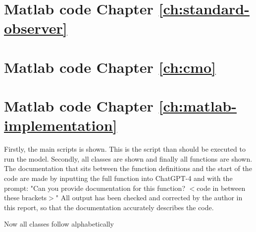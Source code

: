 \begin{appendices}
\section{Matlab code Chapter \ref{ch:standard-observer}}


\section{Matlab code Chapter \ref{ch:cmo}}

    
\section{Matlab code Chapter \ref{ch:matlab-implementation}}\label{ap:matlab-code}
Firstly, the main scripts is shown. This is the script than should be executed to run the model. Secondly, all classes are shown and finally all functions are shown. The documentation that sits between the function definitions and the start of the code are made by inputting the full function into ChatGPT-4 and with the prompt: "Can you provide documentation for this function? $<$code in between these brackets$>$" All output has been checked and corrected by the author in this report, so that the documentation accurately describes the code.

Now all classes follow alphabetically








\end{appendices}
